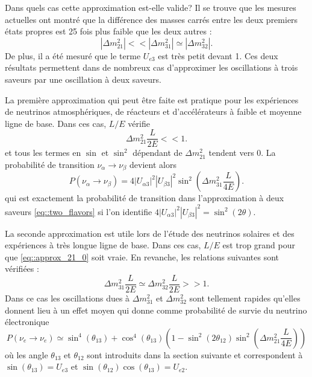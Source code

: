         Dans quels cas cette approximation est-elle valide? Il se trouve que les mesures actuelles ont montré que la différence des masses carrés entre les deux premiers états propres est 25 fois plus faible que les deux autres : 
        \begin{equation}
          |\Delta m^2_{21}| << |\Delta m^2_{31}| \simeq |\Delta m^2_{32}|.
        \end{equation}
        De plus, il a été mesuré que le terme $U_{e3}$ est très petit devant 1. Ces deux résultats permettent dans de nombreux cas d'approximer les oscillations à trois saveurs par une oscillation à deux saveurs.
        
        La première approximation qui peut être faite est pratique pour les expériences de neutrinos atmosphériques, de réacteurs et d'accélérateurs à faible et moyenne ligne de base. Dans ces cas, $L/E$ vérifie
        \begin{equation}\label{eq::approx_21_0}
          \Delta m^2_{21}\frac{L}{2E} << 1.
        \end{equation}
        et tous les termes en $\sin$ et $\sin^2$ dépendant de $\Delta m^2_{21}$ tendent vers 0. La probabilité de transition $\nu_{\alpha}\to\nu_{\beta}$ devient alors
        \begin{equation}
          P(\nu_{\alpha}\to\nu_{\beta}) = 4|U_{\alpha 3}|^2|U_{\beta 3}|^2\sin^2\left(\Delta m^2_{31}\frac{L}{4E}\right).
        \end{equation}
        qui est exactement la probabilité de transition dans l'approximation à deux saveurs \eqref{eq::two_flavors} si l'on identifie $4|U_{\alpha 3}|^2|U_{\beta 3}|^2=\sin^2(2\theta)$.
        
        La seconde approximation est utile lors de l'étude des neutrinos solaires et des expériences à très longue ligne de base. Dans ces cas, $L/E$ est trop grand pour que \eqref{eq::approx_21_0} soit vraie. En revanche, les relations suivantes sont vérifiées : 
        \begin{equation}\label{eq::approx_31_eq_32}
          \Delta m^2_{31}\frac{L}{2E} \simeq \Delta m^2_{32}\frac{L}{2E}  >> 1.
        \end{equation}
        Dans ce cas les oscillations dues à $\Delta m^2_{31}$ et $\Delta m^2_{32}$ sont tellement rapides qu'elles donnent lieu à un effet moyen qui donne comme probabilité de survie du neutrino électronique
        \begin{equation}
          P(\nu_e\to\nu_e) \simeq \sin^4(\theta_{13}) + \cos^4(\theta_{13})\left(1-\sin^2(2\theta_{12})\sin^2\left(\Delta m^2_{21}\frac{L}{4E}\right)\right)
        \end{equation}
        où les angle $\theta_{13}$ et $\theta_{12}$ sont introduits dans la section suivante et correspondent à $\sin(\theta_{13})=U_{e3}$ et $\sin(\theta_{12})\cos(\theta_{13})=U_{e2}$.
        
